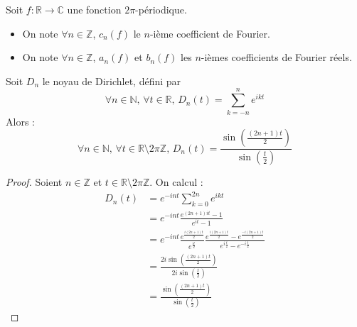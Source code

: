 




	\begin{notation}
		Soit $f : \mathbb{R} \rightarrow \mathbb{C}$ une fonction $2 \pi$-périodique.
		\begin{itemize}
			\item On note $\forall n \in \mathbb{Z}$, $c_n(f)$ le $n$-ième coefficient de Fourier.
			\item On note $\forall n \in \mathbb{Z}$, $a_n(f)$ et $b_n(f)$ les $n$-ièmes coefficients de Fourier réels.
		\end{itemize}
	\end{notation}


	\begin{lemma}
		\label{theoreme-de-dirichlet-1}
		Soit $D_n$ le noyau de Dirichlet, défini par
		\[ \forall n \in \mathbb{N}, \, \forall t \in \mathbb{R}, \, D_n(t) = \sum_{k=-n}^n e^{ikt} \]
		Alors :
		\[ \forall n \in \mathbb{N}, \, \forall t \in \mathbb{R} \setminus 2\pi\mathbb{Z}, \, D_n(t) = \frac{\sin \left ( \frac{(2n + 1)t}{2} \right)}{\sin \left ( \frac{t}{2} \right)} \]
	\end{lemma}

	\begin{proof}
		Soient $n \in \mathbb{Z}$ et $t \in \mathbb{R}\setminus 2\pi\mathbb{Z}$. On calcul :
		\begin{align*}
			D_n(t) &= e^{-int} \sum_{k=0}^{2n} e^{ikt} \\
			&= e^{-int} \frac{e^{(2n+1)it} - 1}{e^{it} - 1} \\
			&= e^{-int} \frac{e^{\frac{i (2n+1) t}{2}}}{e^{\frac{i t}{2}}} \frac{e^{\frac{i (2n+1) t}{2}} - e^{\frac{-i (2n+1) t}{2}}}{e^{i\frac{t}{2}} - e^{-i \frac{t}{2}}} \\
			&= \frac{2i \sin \left ( \frac{(2n + 1)t}{2} \right)}{2i \sin \left ( \frac{t}{2} \right)} \\
			&= \frac{\sin \left ( \frac{(2n + 1)t}{2} \right)}{\sin \left ( \frac{t}{2} \right)}
		\end{align*}
	\end{proof}

